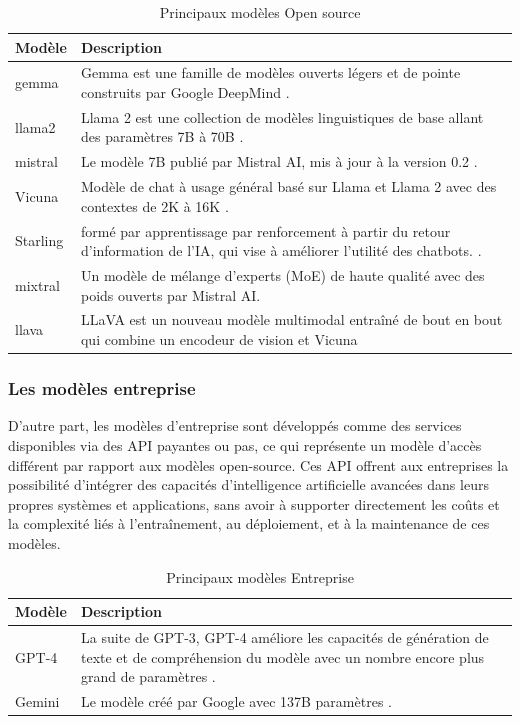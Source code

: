 \begin{table}[H]
\centering
\begin{tabular}{|l|p{12cm}|}
\hline
\textbf{Modèle} & \textbf{Description} \\ \hline
gemma & Gemma est une famille de modèles ouverts légers et de pointe construits par Google DeepMind \cite{gemma_2024}. \\ \hline
llama2  & Llama 2 est une collection de modèles linguistiques de base allant des paramètres 7B à 70B \cite{touvron2023llama}. \\ \hline
mistral & Le modèle 7B publié par Mistral AI, mis à jour à la version 0.2 \cite{jiang2023mistral}. \\ \hline
Vicuna & Modèle de chat à usage général basé sur Llama et Llama 2 avec des contextes de 2K à 16K \cite{vicuna2023}. \\ \hline
Starling & formé par apprentissage par renforcement à partir du retour d'information de l'IA, qui vise à améliorer l'utilité des chatbots. \cite{starling2023}. \\ \hline
mixtral & Un modèle de mélange d'experts (MoE) de haute qualité avec des poids ouverts par Mistral AI. \\ \hline
llava & LLaVA est un nouveau modèle multimodal entraîné de bout en bout qui combine un encodeur de vision et Vicuna \\ \hline
\end{tabular}
\caption{Principaux modèles Open source}
\label{table:llm-models}
\end{table}


\subsubsection{Les modèles entreprise}

D'autre part, les modèles d'entreprise sont développés comme des services disponibles via des API payantes ou pas, ce qui représente un modèle d'accès différent par rapport aux modèles open-source. Ces API offrent aux entreprises la possibilité d'intégrer des capacités d'intelligence artificielle avancées dans leurs propres systèmes et applications, sans avoir à supporter directement les coûts et la complexité liés à l'entraînement, au déploiement, et à la maintenance de ces modèles.
 
\begin{table}[H]
\centering
\begin{tabular}{|l|p{14cm}|}
\hline
\textbf{Modèle} & \textbf{Description} \\ \hline
GPT-4 & La suite de GPT-3, GPT-4 améliore les capacités de génération de texte et de compréhension du modèle avec un nombre encore plus grand de paramètres \cite{openai2023gpt4}. \\ \hline
Gemini & Le modèle créé par Google avec 137B paramètres \cite{geminiteam2023gemini}. \\ \hline
\end{tabular}
\caption{Principaux modèles Entreprise}
\label{table:llm-models-closed}
\end{table}




